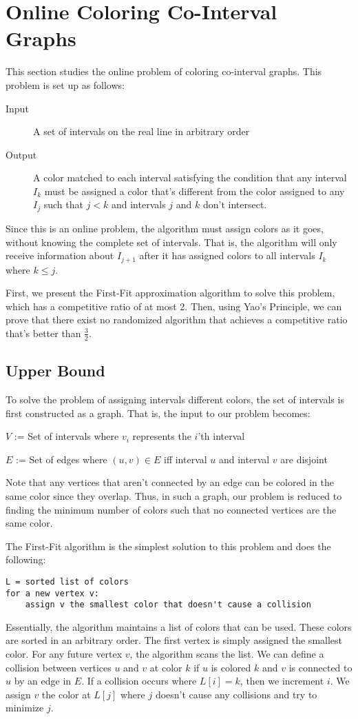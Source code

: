 \section{Online Coloring Co-Interval Graphs}
This section studies the online problem of coloring co-interval graphs. 
This problem is set up as follows:

\begin{description}
	\item[Input] A set of intervals on the real line in arbitrary order
	\item[Output] A color matched to each interval satisfying the condition that any interval $I_k$ must be assigned a color that's different from the color assigned to any $I_j$ such that $j < k$ and intervals $j$ and $k$ don't intersect.
\end{description}

Since this is an online problem, the algorithm must assign colors as it goes, without knowing the complete set of intervals. That is, the algorithm will only receive information about $I_{j+1}$ after it has assigned colors to all intervals $I_k$ where $k \leq j$.

First, we present the First-Fit approximation algorithm to solve this problem, which has a competitive ratio of at most 2. Then, using Yao's Principle, we can prove that there exist no randomized algorithm that achieves a competitive ratio that's better than $\frac{3}{2}$.
\subsection{Upper Bound}
To solve the problem of assigning intervals different colors, the set of intervals is first constructed as a graph. That is, the input to our problem becomes:

$V$ := Set of intervals where $v_i$ represents the $i$'th interval

$E$ := Set of edges where $(u,v) \in E$ iff interval $u$ and interval $v$ are disjoint

Note that any vertices that aren't connected by an edge can be colored in the same color since they overlap. Thus, in such a graph, our problem is reduced to finding the minimum number of colors such that no connected vertices are the same color.

The First-Fit algorithm is the simplest solution to this problem and does the following:
\begin{verbatim}
L = sorted list of colors
for a new vertex v:
    assign v the smallest color that doesn't cause a collision
\end{verbatim}
Essentially, the algorithm maintains a list of colors that can be used. These colors are sorted in an arbitrary order. The first vertex is simply assigned the smallest color. For any future vertex $v$, the algorithm scans the list. We can define a collision between vertices $u$ and $v$ at color $k$ if $u$ is colored $k$ and $v$ is connected to $u$ by an edge in $E$. If a collision occurs where $L[i] = k$, then we increment $i$. We assign $v$ the color at $L[j]$ where $j$ doesn't cause any collisions and try to minimize $j$.


